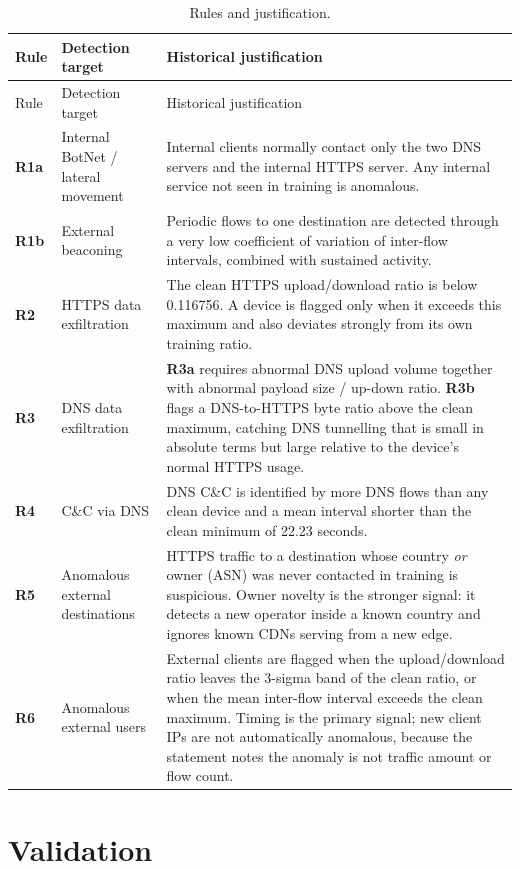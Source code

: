 \documentclass[11pt,a4paper]{article}
\newcommand{\ruleid}[1]{\textbf{#1}}
\begin{document}
\begin{longtable}{p{}p{}p{}}
\caption{Rules and justification.}
\label{tab:rules}\\
\toprule
Rule & Detection target & Historical justification \\
\midrule
\endfirsthead
\toprule
Rule & Detection target & Historical justification \\
\midrule
\endhead
\ruleid{R1a} & Internal BotNet / lateral movement &
Internal clients normally contact only the two DNS servers and the internal
HTTPS server. Any internal service not seen in training is anomalous. \\
\ruleid{R1b} & External beaconing &
Periodic flows to one destination are detected through a very low coefficient
of variation of inter-flow intervals, combined with sustained activity. \\
\ruleid{R2} & HTTPS data exfiltration &
The clean HTTPS upload/download ratio is below 0.116756. A device is flagged
only when it exceeds this maximum and also deviates strongly from its own
training ratio. \\
\ruleid{R3} & DNS data exfiltration &
\ruleid{R3a} requires abnormal DNS upload volume together with abnormal
payload size / up-down ratio. \ruleid{R3b} flags a DNS-to-HTTPS byte ratio
above the clean maximum, catching DNS tunnelling that is small in absolute
terms but large relative to the device's normal HTTPS usage. \\
\ruleid{R4} & C\&C via DNS &
DNS C\&C is identified by more DNS flows than any clean device and a mean
interval shorter than the clean minimum of 22.23 seconds. \\
\ruleid{R5} & Anomalous external destinations &
HTTPS traffic to a destination whose country \emph{or} owner (ASN) was never
contacted in training is suspicious. Owner novelty is the stronger signal: it
detects a new operator inside a known country and ignores known CDNs serving
from a new edge. \\
\ruleid{R6} & Anomalous external users &
External clients are flagged when the upload/download ratio leaves the
3-sigma band of the clean ratio, or when the mean inter-flow interval exceeds
the clean maximum. Timing is the primary signal; new client IPs are not
automatically anomalous, because the statement notes the anomaly is not
traffic amount or flow count. \\
\bottomrule
\end{longtable}

\section{Validation}
\end{document}
